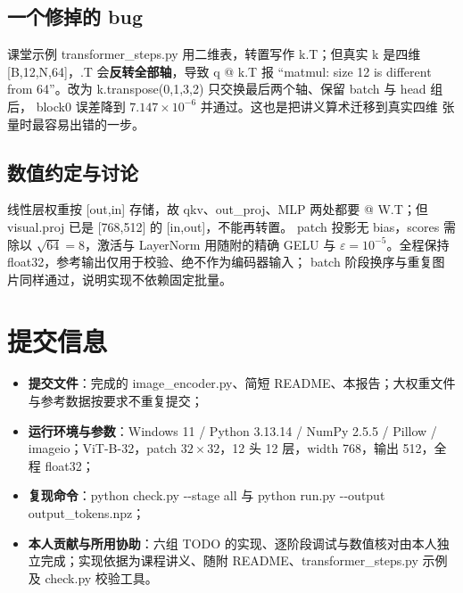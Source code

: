 \documentclass[a4paper,12pt]{article}
\newcommand{\code}[1]{{\ttfamily\footnotesize #1}}
\begin{document}
\subsection{一个修掉的 bug}

课堂示例 \code{transformer\_steps.py} 用二维表，转置写作 \code{k.T}；但真实
\code{k} 是四维 \code{[B,12,N,64]}，\code{.T} 会\textbf{反转全部轴}，导致
\code{q @ k.T} 报 “matmul: size 12 is different from 64”。改为
\code{k.transpose(0,1,3,2)} 只交换最后两个轴、保留 batch 与 head 组后，
\code{block0} 误差降到 $7.147\times10^{-6}$ 并通过。这也是把讲义算术迁移到真实四维
张量时最容易出错的一步。

\subsection{数值约定与讨论}

线性层权重按 \code{[out,in]} 存储，故 \code{qkv}、\code{out\_proj}、MLP 两处都要
\code{@ W.T}；但 \code{visual.proj} 已是 \code{[768,512]} 的 \code{[in,out]}，不能再转置。
patch 投影无 bias，scores 需除以 $\sqrt{64}=8$，激活与 LayerNorm 用随附的精确 GELU 与
$\varepsilon=10^{-5}$。全程保持 float32，参考输出仅用于校验、绝不作为编码器输入；
\code{batch} 阶段换序与重复图片同样通过，说明实现不依赖固定批量。

\section{提交信息}

\begin{itemize}
    \item \textbf{提交文件}：完成的 \code{image\_encoder.py}、简短 README、本报告；大权重文件与参考数据按要求不重复提交；
    \item \textbf{运行环境与参数}：Windows 11 / Python 3.13.14 / NumPy 2.5.5 / Pillow / imageio；ViT-B-32，patch $32\!\times\!32$，12 头 12 层，width 768，输出 512，全程 float32；
    \item \textbf{复现命令}：\code{python check.py -{}-stage all} 与 \code{python run.py -{}-output output\_tokens.npz}；
    \item \textbf{本人贡献与所用协助}：六组 TODO 的实现、逐阶段调试与数值核对由本人独立完成；实现依据为课程讲义、随附 README、\code{transformer\_steps.py} 示例及 \code{check.py} 校验工具。
\end{itemize}

\newpage

\end{document}
